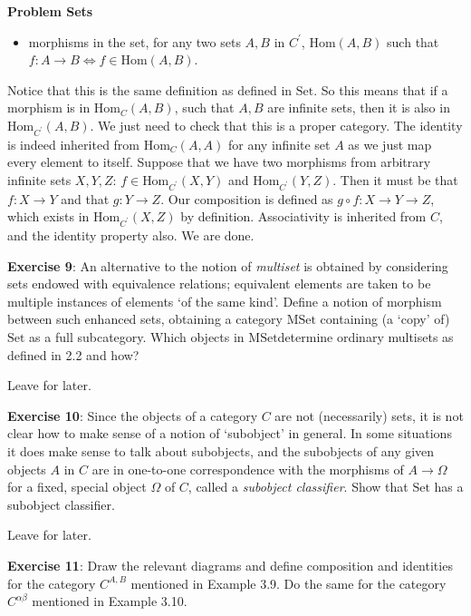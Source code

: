 \documentclass{report}
\begin{document}
\begin{exercises}{\textbf{Problem Sets}}
\begin{answer}
\begin{itemize}
                    \item morphisms in the set, for any two sets $A, B$ in $C^{\prime}$, $\text{Hom}(A, B)$ such that $f : A \rightarrow B \iff f \in \text{Hom}(A, B)$.
                \end{itemize}
            Notice that this is the same definition as defined in $\text{Set}$. So this means that if a morphism is in $\text{Hom}_{C}(A, B)$, such that $A, B$ are infinite sets, then it is also in $\text{Hom}_{C^{\prime}}(A, B)$. We just need to check that this is a proper category. The identity is indeed inherited from $\text{Hom}_{C}(A, A)$ for any infinite set $A$ as we just map every element to itself. Suppose that we have two morphisms from arbitrary infinite sets $X, Y, Z$: $f \in \text{Hom}_{C^{\prime}}(X, Y)$ and $\text{Hom}_{C^{\prime}}(Y, Z)$. Then it must be that $f : X \rightarrow Y$ and that $g : Y \rightarrow Z$. Our composition is defined as $g \circ f : X \rightarrow Y \rightarrow Z$, which exists in $\text{Hom}_{C^{\prime}}(X, Z)$ by definition. Associativity is inherited from $C$, and the identity property also. We are done.
        \end{answer}

    \textbf{Exercise 9}: An alternative to the notion of \textit{multiset} is obtained by considering sets endowed with equivalence relations; equivalent elements are taken to be multiple instances of elements `of the same kind'. Define a notion of morphism between such enhanced sets, obtaining a category $\text{MSet}$ containing (a `copy' of) $\text{Set}$ as a full subcategory. Which objects in $\text{MSet}$determine ordinary multisets as defined in 2.2 and how? 
        \begin{answer}
            Leave for later.
        \end{answer}

    \textbf{Exercise 10}: Since the objects of a category $C$ are not (necessarily) sets, it is not clear how to make sense of a notion of `subobject' in general. In some situations it does make sense to talk about subobjects, and the subobjects of any given objects $A$ in $C$ are in one-to-one correspondence with the morphisms of $A \rightarrow \Omega$ for a fixed, special object $\Omega$ of $C$, called a \textit{subobject classifier}. Show that $\text{Set}$ has a subobject classifier.
        \begin{answer}
            Leave for later.
        \end{answer}

    \textbf{Exercise 11}: Draw the relevant diagrams and define composition and identities for the category $C^{A, B}$ mentioned in Example 3.9. Do the same for the category $C^{\alpha\beta}$ mentioned in Example 3.10.
\end{exercises}
\end{document}
